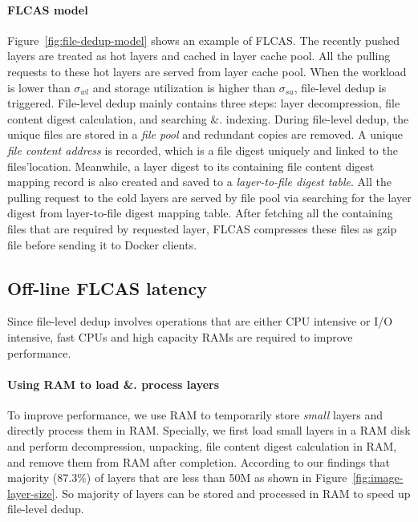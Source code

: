\paragraph{FLCAS model}
Figure~\ref{fig:file-dedup-model} shows an example of FLCAS.
%
%
%
The recently pushed layers are treated as hot layers and cached in layer cache pool. 
All the pulling requests to these hot layers are served from layer cache pool.
When the workload is lower than $\sigma_{wl}$ and storage utilization is higher than $\sigma_{su}$, file-level dedup is triggered. 
File-level dedup mainly contains three steps: layer decompression, file content digest calculation, and searching \&. indexing.
During file-level dedup, the unique files are stored in a \textit{file pool} and redundant copies are removed.  
A unique \textit{file content address} is recorded, which is a
file digest uniquely and linked to the files'location.
Meanwhile, a layer digest to its containing file content digest mapping record is also created and saved to a \textit{layer-to-file digest table}. 
 All the pulling request to the cold layers are served by file pool via searching for the layer digest from layer-to-file digest mapping table. After fetching all the containing files that are required by requested layer, FLCAS compresses these files as gzip file before sending it to Docker clients.         

\subsection{Off-line FLCAS latency} 

Since file-level dedup involves operations that are either CPU intensive or I/O intensive, fast CPUs and high capacity RAMs are required to improve performance.

\paragraph{Using RAM to load \&. process layers}

To improve performance, we use RAM to temporarily store \textit{small} layers and directly process them in RAM.
Specially, we first load small layers in a RAM disk and perform decompression, unpacking, file content digest calculation in RAM, and remove them from RAM after completion.   
According to our findings that majority (87.3\%) of layers that are less than 50M as shown in Figure~\ref{fig:image-layer-size}. So majority of layers can be stored and processed in RAM to speed up file-level dedup. 
%
%

